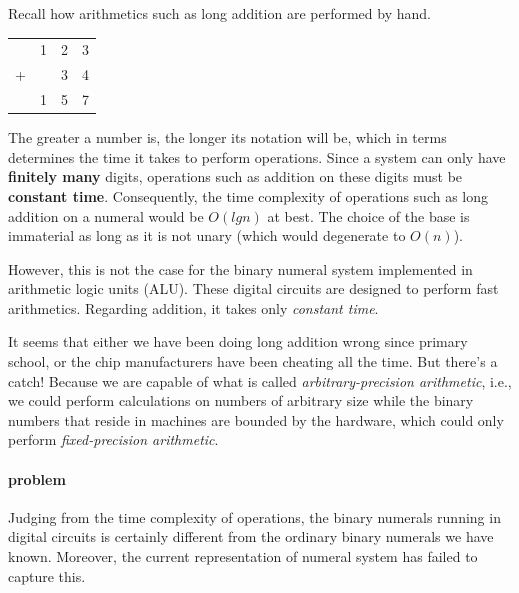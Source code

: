 \documentclass[../thesis.tex]{subfiles}
\begin{document}
Recall how arithmetics such as long addition are performed by hand.

\begin{center}
    \begin{tabular}{c@{\,}c@{\,}c@{\,}c}
      & 1 & 2 & 3 \\
    + &   & 3 & 4 \\
    \hline
      & 1 & 5 & 7 \\
    \end{tabular}
\end{center}

The greater a number is, the longer its notation will be, which in terms
determines the time it takes to perform operations.
Since a system can only have \textbf{finitely many} digits, operations such as
addition on these digits must be \textbf{constant time}.
Consequently, the time complexity of operations such as long addition on a numeral
would be $ O(lg n) $ at best.
The choice of the base is immaterial as long as it is not unary (which would degenerate to $ O(n) $).

However, this is not the case for the binary numeral system implemented in
arithmetic logic units (ALU). These digital circuits are designed to perform fast
arithmetics. Regarding addition, it takes only \textit{constant time}.


It seems that either we have been doing long addition wrong since primary school,
or the chip manufacturers have been cheating all the time. But there's a catch!
Because we are capable of what is called \textit{arbitrary-precision arithmetic},
i.e., we could perform calculations on numbers of arbitrary size
while the binary numbers that reside in machines are bounded by the hardware,
which could only perform \textit{fixed-precision arithmetic}.

\paragraph{problem}
Judging from the time complexity of operations, the binary numerals running in
digital circuits is certainly different from the ordinary binary numerals we have
known. Moreover, the current representation of numeral system has failed to capture this.

\end{document}
